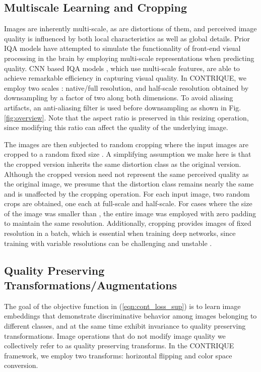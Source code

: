 \documentclass[journal]{IEEEtran}
\begin{document}
\subsection{Multiscale Learning and Cropping}
Images are inherently multi-scale, as are distortions of them, and perceived image quality is influenced by both local characteristics as well as global details. Prior IQA models \cite{wang2003multiscale,moorthy2011blind,mittal2012no,mittal2013making} have attempted to simulate the functionality of front-end visual processing in the brain by employing multi-scale representations when predicting quality. CNN based IQA models \cite{zhang2018unreasonable,su2020blindly}, which use multi-scale features, are able to achieve remarkable efficiency in capturing visual quality. In CONTRIQUE, we employ two scales : native/full resolution, and half-scale resolution obtained by downsampling by a factor of two along both dimensions. To avoid aliasing artifacts, an anti-aliasing filter is used before downsampling as shown in Fig. \ref{fig:overview}. Note that the aspect ratio is preserved in this resizing operation, since modifying this ratio can affect the quality of the underlying image.

The images are then subjected to random cropping where the input images are cropped to a random fixed size . A simplifying assumption we make here is that the cropped version inherits the same distortion class as the original version. Although the cropped version need not represent the same perceived quality as the original image, we presume that the distortion class remains nearly the same and is unaffected by the cropping operation. For each input image, two random crops are obtained, one each at full-scale and half-scale. For cases where the size of the image was smaller than , the entire image was employed with zero padding to maintain the same resolution. Additionally, cropping provides images of fixed resolution in a batch, which is essential when training deep networks, since training with variable resolutions can be challenging and unstable \cite{ying2019patches}.

\subsection{Quality Preserving Transformations/Augmentations}
\label{sec:transform}
The goal of the objective function in (\ref{eqn:cont_loss_sup}) is to learn image embeddings that demonstrate discriminative behavior among images belonging to different classes, and at the same time exhibit invariance to quality preserving transformations. Image operations that do not modify image quality we collectively refer to as quality preserving transforms. In the CONTRIQUE framework, we employ two transforms: horizontal flipping and color space conversion. 
\end{document}

